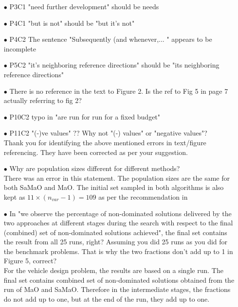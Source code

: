 \documentclass[onecolumn,10pt]{asme2ej}
\begin{document}
\begin{itemize}

\item[$\bullet$]	P3C1 "need further development" should be needs 
\item[$\bullet$]	P4C1 "but is not" should be "but it's not"
\item[$\bullet$]	P4C2 The sentence "Subsequently (and whenever,... " appears to be incomplete
\item[$\bullet$]	P5C2 "it's neighboring reference directions" should be "its neighboring reference directions"
\item[$\bullet$]	There is no reference in the text to Figure 2. Is the ref to Fig 5 in page 7 actually referring to fig 2?
\item[$\bullet$]	P10C2 typo in "are run for run for a fixed budget"
\item[$\bullet$]	P11C2 "(-)ve values" ?? Why not "(-) values" or "negative values"? \\

{\color{blue}Thank you for identifying the above mentioned errors in text/figure referencing. They have been corrected as per your suggestion. } \\

\item[$\bullet$]	Why are population sizes different for different methods? \\

{\color{blue} There was an error in this statement. The population sizes are the same for both SaMaO and MaO. The initial set sampled in both algorithms is also kept as $11 \times (n_{var}-1)=109$ as per the recommendation in \cite{KHTchugh2016krvea}} \\


\item[$\bullet$]	In "we observe the percentage of non-dominated solutions delivered by the two approaches at different stages during the search with respect to the final (combined) set of non-dominated solutions achieved", the final set contains the result from all 25 runs, right? Assuming you did 25 runs as you did for the benchmark problems. That is why the two fractions don't add up to 1 in Figure 5, correct? \\

{\color{blue}
For the vehicle design problem, the results are based on a single run. The final set contains combined set of non-dominated solutions obtained from the run of MaO and SaMaO. Therefore in the intermediate stages, the fractions do not add up to one, but at the end of the run, they add up to one.   
}

\end{itemize}
\end{document}
